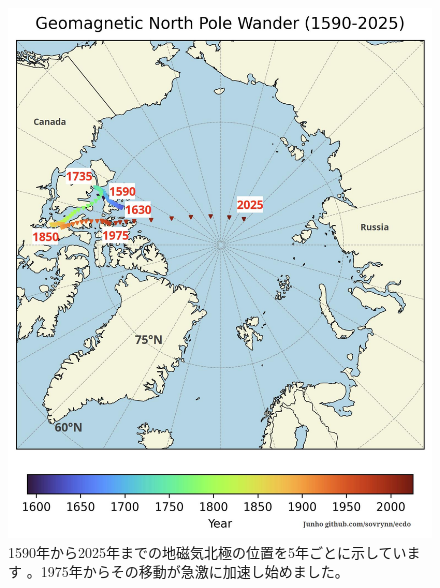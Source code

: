 \documentclass[10pt,twocolumn,letterpaper]{article}
\begin{document}
\begin{figure}[t]
\begin{center}
   \includegraphics[width=1\linewidth]{npw.jpg}
\end{center}
   \caption{1590年から2025年までの地磁気北極の位置を5年ごとに示しています \cite{41}。1975年からその移動が急激に加速し始めました。}
\label{fig:13}
\label{fig:onecol}
\end{figure}
\end{document}
